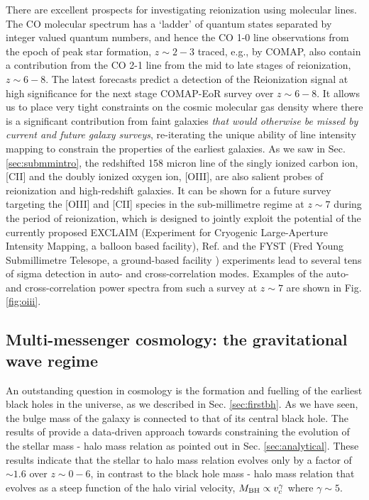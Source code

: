 There are excellent prospects for investigating reionization using molecular lines. The CO molecular spectrum has a `ladder' of quantum states separated by integer valued quantum numbers, and hence the CO 1-0 line  observations from the epoch of peak star formation, $z \sim 2 - 3$ traced, e.g., by COMAP, also contain a contribution from the CO 2-1 line from the mid to late stages of reionization, $z \sim 6-8$. The latest forecasts predict a detection \cite{breysse2021} of the Reionization signal at high significance
for the next stage COMAP-EoR survey over $z \sim 6 - 8$. It allows us to place very tight constraints on the cosmic molecular
gas density where there is a significant contribution from faint galaxies {\it that would otherwise be missed by current
and future galaxy surveys}, re-iterating the unique ability of line intensity mapping to constrain the properties of the
earliest galaxies. As we saw in Sec. \ref{sec:submmintro}, the redshifted 158 micron line of the singly ionized carbon ion, [CII] and the doubly ionized oxygen ion, [OIII], are also salient probes of reionization and high-redshift galaxies. It can be shown \cite{hpoiii} for a future survey targeting the [OIII] and [CII] species in the sub-millimetre regime at $z \sim 7$ during the period of reionization, which is designed to jointly exploit the potential of the currently proposed EXCLAIM (Experiment for Cryogenic Large-Aperture Intensity Mapping, a balloon based facility), Ref. \cite{cataldo2021} and the FYST (Fred Young Submillimetre Telesope, a ground-based facility \cite{terry2019}) experiments lead to several tens of sigma detection in auto- and cross-correlation modes. Examples of the auto- and cross-correlation power spectra from such a survey at $z \sim 7$ are shown in Fig. \ref{fig:oiii}.


\subsection{Multi-messenger cosmology: the gravitational wave regime}



An outstanding question in cosmology is the formation and fuelling of the earliest black holes in the universe, as we described in Sec. \ref{sec:firstbh}. As we have seen, the bulge mass of the galaxy is connected to that of its central black hole. The results of \cite{behroozi2019} provide a data-driven approach towards constraining the evolution of the stellar mass - halo mass relation as pointed out in Sec. \ref{sec:analytical}. These results indicate that the stellar to halo mass relation evolves only by a factor of $\sim 1.6$ over $z \sim 0-6$, in contrast to the black hole mass - halo mass relation that evolves as a steep function of the halo virial velocity, $M_{\rm BH} \propto v_c^{\gamma}$ where $\gamma \sim 5$.

